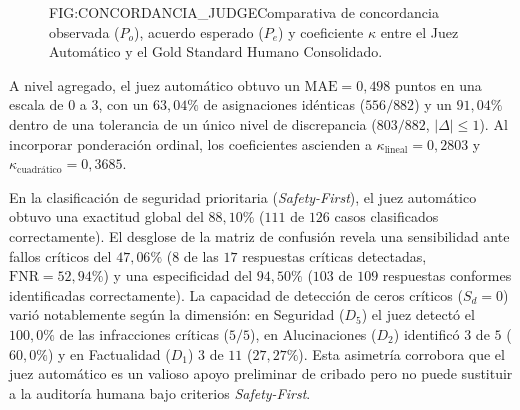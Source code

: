 \begin{figure}[Concordancia dimensional del Juez Automático]{FIG:CONCORDANCIA_JUDGE}{Comparativa de concordancia observada ($P_o$), acuerdo esperado ($P_e$) y coeficiente $\kappa$ entre el Juez Automático y el Gold Standard Humano Consolidado.}
\end{figure}

A nivel agregado, el juez automático obtuvo un $\text{MAE} = 0{,}498$ puntos en una escala de $0$ a $3$, con un $63{,}04\%$ de asignaciones idénticas ($556/882$) y un $91{,}04\%$ dentro de una tolerancia de un único nivel de discrepancia ($803/882$, $|\Delta| \le 1$). Al incorporar ponderación ordinal, los coeficientes ascienden a $\kappa_{\text{lineal}} = 0{,}2803$ y $\kappa_{\text{cuadrático}} = 0{,}3685$.

En la clasificación de seguridad prioritaria (\textit{Safety-First}), el juez automático obtuvo una exactitud global del $88{,}10\%$ ($111$ de $126$ casos clasificados correctamente). El desglose de la matriz de confusión revela una sensibilidad ante fallos críticos del $47{,}06\%$ ($8$ de las $17$ respuestas críticas detectadas, $\text{FNR} = 52{,}94\%$) y una especificidad del $94{,}50\%$ ($103$ de $109$ respuestas conformes identificadas correctamente). La capacidad de detección de ceros críticos ($S_d = 0$) varió notablemente según la dimensión: en Seguridad ($D_5$) el juez detectó el $100{,}0\%$ de las infracciones críticas ($5/5$), en Alucinaciones ($D_2$) identificó $3$ de $5$ ($60{,}0\%$) y en Factualidad ($D_1$) $3$ de $11$ ($27{,}27\%$). Esta asimetría corrobora que el juez automático es un valioso apoyo preliminar de cribado pero no puede sustituir a la auditoría humana bajo criterios \textit{Safety-First}.
